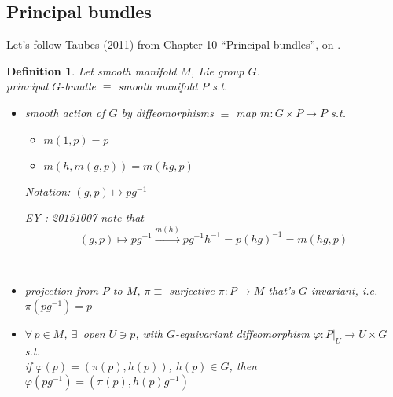 \documentclass[10pt]{amsart}
\newtheorem{definition}{Definition}
\begin{document}
\begin{multicols*}{2}
\section{Principal bundles}

Let's follow Taubes (2011) from Chapter 10 ``Principal bundles'', on \cite{CTaubes2011}.


\begin{definition}
  Let smooth manifold $M$, Lie group $G$. \\
  \emph{principal} $G$-bundle $\equiv $ smooth manifold $P$ s.t. 
\begin{itemize}
  \item smooth action of $G$ by diffeomorphisms $\equiv$ map $m: G \times P \to P$ s.t. 
    \begin{itemize}
      \item $m(1,p) =p$
      \item $m(h,m(g,p)) = m(hg,p)$
    \end{itemize}
    Notation: $(g,p) \mapsto pg^{-1}$

EY : 20151007 note that 
\[
(g,p) \mapsto pg^{-1} \xrightarrow{m(h)} pg^{-1}h^{-1} = p(hg)^{-1} = m(hg,p)
\]
 \quad \quad \, 
  \item projection from $P$ to $M$, $\pi \equiv $ surjective $\pi : P \to M$ that's $G$-invariant, i.e. $\pi(pg^{-1}) =p$
  \item $\forall \, p \in M$, $\exists \, $ open $U \ni p$, with $G$-equivariant diffeomorphism $\varphi : \left. P \right|_{U} \to U\times G$ s.t. \\
if $\varphi(p)  = (\pi(p), h(p))$, $h(p) \in G$, then $\varphi(pg^{-1}) = (\pi(p), h(p)g^{-1})$


\end{itemize}
\end{definition}
\end{multicols*}
\end{document}
